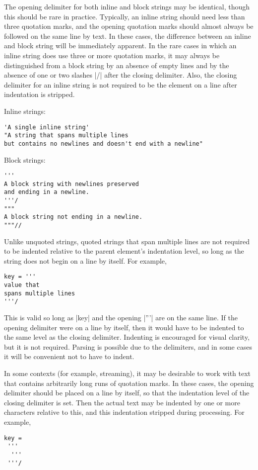 \documentclass[11pt]{article}
\begin{document}
The opening delimiter for both inline and block strings may be identical, though this should be rare in practice.  Typically, an inline string should need less than three quotation marks, and the opening quotation marks should almost always be followed on the same line by text.  In these cases, the difference between an inline and block string will be immediately apparent.  In the rare cases in which an inline string does use three or more quotation marks, it may always be distinguished from a block string by an absence of empty lines and by the absence of one or two slashes |/| after the closing delimiter.  Also, the closing delimiter for an inline string is not required to be the element on a line after indentation is stripped.

Inline strings:
\begin{Verbatim}
'A single inline string'
"A string that spans multiple lines
but contains no newlines and doesn't end with a newline"
\end{Verbatim}

Block strings:
\begin{Verbatim}
'''
A block string with newlines preserved
and ending in a newline.
'''/
"""
A block string not ending in a newline.
"""//
\end{Verbatim}

Unlike unquoted strings, quoted strings that span multiple lines are not required to be indented relative to the parent element's indentation level, so long as the string does not begin on a line by itself.  For example,
\begin{Verbatim}
key = '''
value that
spans multiple lines
'''/
\end{Verbatim}
This is valid so long as |key| and the opening |'''| are on the same line.  If the opening delimiter were on a line by itself, then it would have to be indented to the same level as the closing delimiter.  Indenting is encouraged for visual clarity, but it is not required.  Parsing is possible due to the delimiters, and in some cases it will be convenient not to have to indent.

In some contexts (for example, streaming), it may be desirable to work with text that contains arbitrarily long runs of quotation marks.  In these cases, the opening delimiter should be placed on a line by itself, so that the indentation level of the closing delimiter is set.  Then the actual text may be indented by one or more characters relative to this, and this indentation stripped during processing.  For example,
\begin{Verbatim}
key =
 '''
  '''
 '''/
\end{Verbatim}
\end{document}
